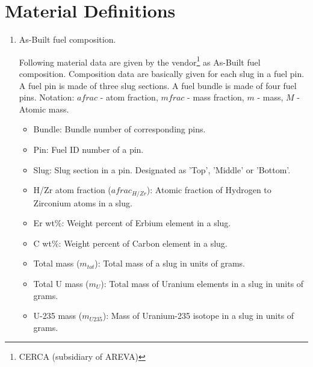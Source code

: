 \documentclass{UWNR_modeling}
\begin{document}
\section{Material Definitions}\label{section:materials}
\begin{enumerate}
\item As-Built fuel composition.

Following material data are given by the vendor\footnote{CERCA (subsidiary of AREVA)} as As-Built fuel composition. Composition data are basically given for each slug in a fuel pin. A fuel pin is made of three slug sections. A fuel bundle is made of four fuel pins.
\newline Notation: $afrac$ - atom fraction, $mfrac$ - mass fraction, $m$ - mass, $M$ - Atomic mass.
\begin{itemize}
\item Bundle: Bundle number of corresponding pins.
\item Pin: Fuel ID number of a pin.
\item Slug: Slug section in a pin. Designated as 'Top', 'Middle' or 'Bottom'.
\item H/Zr atom fraction ($afrac_{H/Zr}$): Atomic fraction of Hydrogen to Zirconium atoms in a slug.
\item Er wt\%: Weight percent of Erbium element in a slug.
\item C wt\%: Weight percent of Carbon element in a slug.
\item Total mass ($m_{tot}$): Total mass of a slug in units of grams.
\item Total U mass ($m_{U}$): Total mass of Uranium elements in a slug in units of grams.
\item U-235 mass ($m_{U235}$): Mass of Uranium-235 isotope in a slug in units of grams.
\end{itemize}


\end{enumerate}
\end{document}
